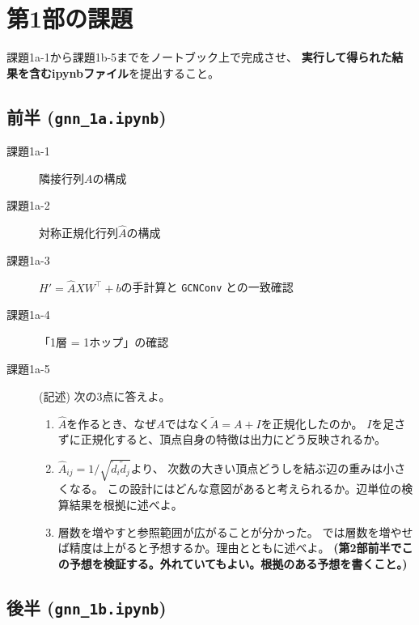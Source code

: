 \documentclass[11pt,a4paper]{jsarticle}
\begin{document}
\section{第1部の課題}

課題1a-1から課題1b-5までをノートブック上で完成させ、
\textbf{実行して得られた結果を含むipynbファイル}を提出すること。

\subsection*{前半 (\texttt{gnn\_1a.ipynb})}

\begin{description}
\item[課題1a-1] 隣接行列$A$の構成
\item[課題1a-2] 対称正規化行列$\hat{A}$の構成
\item[課題1a-3] $H'=\hat{A}XW^{\top}+b$の手計算と \verb|GCNConv| との一致確認
\item[課題1a-4] 「1層 = 1ホップ」の確認
\item[課題1a-5] (記述) 次の3点に答えよ。
  \begin{enumerate}
  \item $\hat{A}$を作るとき、なぜ$A$ではなく$\tilde{A}=A+I$を正規化したのか。
    $I$を足さずに正規化すると、頂点自身の特徴は出力にどう反映されるか。
  \item $\hat{A}_{ij}=1/\sqrt{\tilde{d}_i\tilde{d}_j}$より、
    次数の大きい頂点どうしを結ぶ辺の重みは小さくなる。
    この設計にはどんな意図があると考えられるか。辺単位の検算結果を根拠に述べよ。
  \item 層数を増やすと参照範囲が広がることが分かった。
    では層数を増やせば精度は上がると予想するか。理由とともに述べよ。
    \textbf{(第2部前半でこの予想を検証する。外れていてもよい。根拠のある予想を書くこと。)}
  \end{enumerate}
\end{description}

\subsection*{後半 (\texttt{gnn\_1b.ipynb})}
\end{document}
